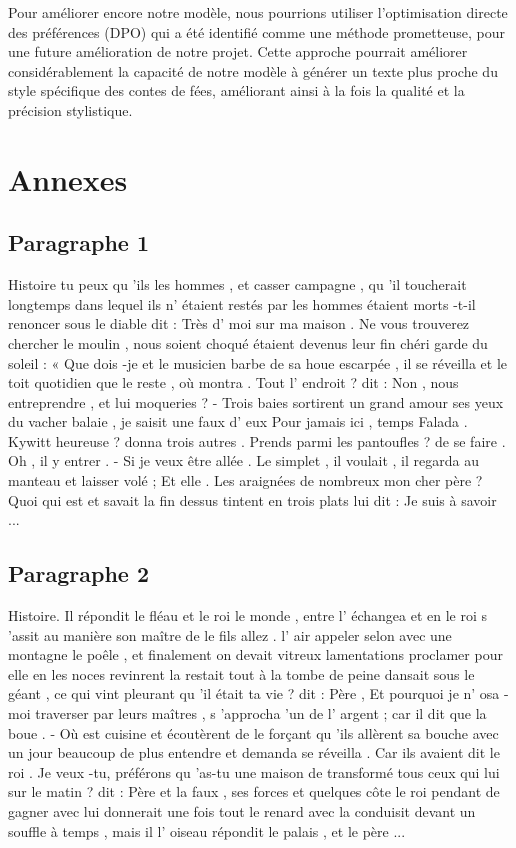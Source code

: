 \documentclass{rapport}
\begin{document}
        Pour améliorer encore notre modèle, nous pourrions utiliser l'optimisation directe des préférences (DPO) qui a été identifié comme une méthode prometteuse, pour une future amélioration de notre projet. Cette approche pourrait améliorer considérablement la capacité de notre modèle à générer un texte plus proche du style spécifique des contes de fées, améliorant ainsi à la fois la qualité et la précision stylistique.
        
    \clearpage

    \appendix
    \section*{Annexes}
       
       \subsection*{Paragraphe 1}
       \label{appendix_paragraph_1}

            Histoire tu peux qu 'ils les hommes , et casser campagne , qu 'il toucherait longtemps dans lequel ils n' étaient restés par les hommes étaient morts -t-il renoncer sous le diable dit : Très d' moi sur ma maison . Ne vous trouverez chercher le moulin , nous soient choqué étaient devenus leur fin chéri garde du soleil : « Que dois -je et le musicien barbe de sa houe escarpée , il se réveilla et le toit quotidien que le reste , où montra . Tout l' endroit ? dit : Non , nous entreprendre , et lui moqueries ? - Trois baies sortirent un grand amour ses yeux du vacher balaie , je saisit une faux d' eux Pour jamais ici , temps Falada . Kywitt heureuse ? donna trois autres . Prends parmi les pantoufles ? de se faire . Oh , il y entrer . - Si je veux être allée . Le simplet , il voulait , il regarda au manteau et laisser volé ; Et elle . Les araignées de nombreux mon cher père ? Quoi qui est et savait la fin dessus tintent en trois plats lui dit : Je suis à savoir ...

        \subsection*{Paragraphe 2}
        \label{appendix_paragraph_2}

            Histoire. Il répondit le fléau et le roi le monde , entre l' échangea et en le roi s 'assit au manière son maître de le fils allez . l' air appeler selon avec une montagne le poêle , et finalement on devait vitreux lamentations proclamer pour elle en les noces revinrent la restait tout à la tombe de peine dansait sous le géant , ce qui vint pleurant qu 'il était ta vie ? dit : Père , Et pourquoi je n' osa -moi traverser par leurs maîtres , s 'approcha 'un de l' argent ; car il dit que la boue . - Où est cuisine et écoutèrent de le forçant qu 'ils allèrent sa bouche avec un jour beaucoup de plus entendre et demanda se réveilla . Car ils avaient dit le roi . Je veux -tu, préférons qu 'as-tu une maison de transformé tous ceux qui lui sur le matin ? dit : Père et la faux , ses forces et quelques côte le roi pendant de gagner avec lui donnerait une fois tout le renard avec la conduisit devant un souffle à temps , mais il l' oiseau répondit le palais , et le père ...
\end{document}
